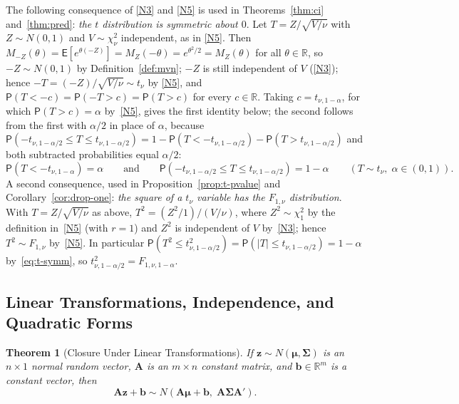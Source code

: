 \documentclass[14pt]{extarticle}
\theoremstyle{plain}
\newtheorem{theorem}{Theorem}[section]
\theoremstyle{definition}
\theoremstyle{remark}
\newcommand\expc{\mathsf{E}}
\newcommand\prb{\mathsf{P}}
\newcommand{\bz}{\mathbf{z}}
\newcommand{\bA}{\mathbf{A}}
\newcommand{\Real}{\mathbb{R}}
\begin{document}
The following consequence of \ref{N3} and \ref{N5} is used in Theorems~\ref{thm:ci} and~\ref{thm:pred}: \emph{the $t$ distribution is symmetric about $0$}. Let $T = Z/\sqrt{V/\nu}$ with $Z \sim N(0,1)$ and $V \sim \chi^2_\nu$ independent, as in \ref{N5}. Then $M_{-Z}(\theta) = \expc[e^{\theta(-Z)}] = M_Z(-\theta) = e^{\theta^2/2} = M_Z(\theta)$ for all $\theta \in \Real$, so $-Z \sim N(0,1)$ by Definition~\ref{def:mvn}; $-Z$ is still independent of $V$ (\ref{N3}); hence $-T = (-Z)/\sqrt{V/\nu} \sim t_\nu$ by \ref{N5}, and $\prb(T < -c) = \prb(-T > c) = \prb(T > c)$ for every $c \in \Real$. Taking $c = t_{\nu,1-\alpha}$, for which $\prb(T > c) = \alpha$ by~\ref{N5}, gives the first identity below; the second follows from the first with $\alpha/2$ in place of $\alpha$, because $\prb(-t_{\nu,1-\alpha/2} \leqslant T \leqslant t_{\nu,1-\alpha/2}) = 1 - \prb(T < -t_{\nu,1-\alpha/2}) - \prb(T > t_{\nu,1-\alpha/2})$ and both subtracted probabilities equal $\alpha/2$:
\begin{equation}\label{eq:t-symm}
\prb(T < -t_{\nu,1-\alpha}) = \alpha \qquad\text{and}\qquad \prb(-t_{\nu,1-\alpha/2} \leqslant T \leqslant t_{\nu,1-\alpha/2}) = 1 - \alpha \qquad (T \sim t_\nu,\; \alpha \in (0,1)).
\end{equation}
A second consequence, used in Proposition~\ref{prop:t-pvalue} and Corollary~\ref{cor:drop-one}: \emph{the square of a $t_\nu$ variable has the $F_{1,\nu}$ distribution}. With $T = Z/\sqrt{V/\nu}$ as above, $T^2 = (Z^2/1)/(V/\nu)$, where $Z^2 \sim \chi^2_1$ by the definition in~\ref{N5} (with $r = 1$) and $Z^2$ is independent of $V$ by~\ref{N3}; hence $T^2 \sim F_{1,\nu}$ by~\ref{N5}. In particular $\prb(T^2 \leqslant t_{\nu,1-\alpha/2}^2) = \prb(|T| \leqslant t_{\nu,1-\alpha/2}) = 1 - \alpha$ by~\eqref{eq:t-symm}, so $t_{\nu,1-\alpha/2}^2 = F_{1,\nu,1-\alpha}$.

\subsection{Linear Transformations, Independence, and Quadratic Forms}

\begin{theorem}[Closure Under Linear Transformations]\label{thm:mvn-linear}
If $\bz \sim N(\boldsymbol\mu, \boldsymbol\Sigma)$ is an $n \times 1$ normal random vector, $\bA$ is an $m \times n$ constant matrix, and $\mathbf{b} \in \Real^m$ is a constant vector, then
\begin{equation}
\bA\bz + \mathbf{b} \sim N(\bA\boldsymbol\mu + \mathbf{b},\; \bA\boldsymbol\Sigma\bA').
\end{equation}
\end{theorem}
\end{document}
